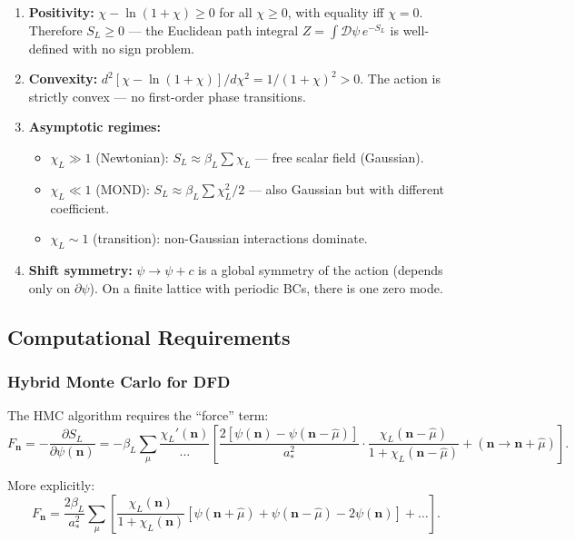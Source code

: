 \documentclass[11pt,a4paper]{article}
\begin{document}
\begin{enumerate}
\item \textbf{Positivity:} $\chi - \ln(1+\chi) \geq 0$ for all $\chi \geq 0$, with equality iff $\chi = 0$. Therefore $S_L \geq 0$ --- the Euclidean path integral $Z = \int\mathcal{D}\psi\,e^{-S_L}$ is well-defined with no sign problem.

\item \textbf{Convexity:} $d^2[\chi-\ln(1+\chi)]/d\chi^2 = 1/(1+\chi)^2 > 0$. The action is strictly convex --- no first-order phase transitions.

\item \textbf{Asymptotic regimes:}
\begin{itemize}
\item $\chi_L \gg 1$ (Newtonian): $S_L \approx \beta_L\sum\chi_L$ --- free scalar field (Gaussian).
\item $\chi_L \ll 1$ (MOND): $S_L \approx \beta_L\sum\chi_L^2/2$ --- also Gaussian but with different coefficient.
\item $\chi_L \sim 1$ (transition): non-Gaussian interactions dominate.
\end{itemize}

\item \textbf{Shift symmetry:} $\psi \to \psi + c$ is a global symmetry of the action (depends only on $\partial\psi$). On a finite lattice with periodic BCs, there is one zero mode.
\end{enumerate}

\subsection{Computational Requirements}

\subsubsection{Hybrid Monte Carlo for DFD}

The HMC algorithm requires the ``force'' term:
\begin{equation}
F_{\mathbf{n}} = -\frac{\partial S_L}{\partial\psi(\mathbf{n})} = -\beta_L\sum_\mu\frac{\chi_L'(\mathbf{n})}{\text{...}}\left[\frac{2[\psi(\mathbf{n})-\psi(\mathbf{n}-\hat\mu)]}{a_*^2}\cdot\frac{\chi_L(\mathbf{n}-\hat\mu)}{1+\chi_L(\mathbf{n}-\hat\mu)} + (\mathbf{n} \to \mathbf{n}+\hat\mu)\right].
\end{equation}

More explicitly:
\begin{equation}
F_{\mathbf{n}} = \frac{2\beta_L}{a_*^2}\sum_\mu\left[\frac{\chi_L(\mathbf{n})}{1+\chi_L(\mathbf{n})}[\psi(\mathbf{n}+\hat\mu)+\psi(\mathbf{n}-\hat\mu)-2\psi(\mathbf{n})] + \ldots\right].
\end{equation}
\end{document}
